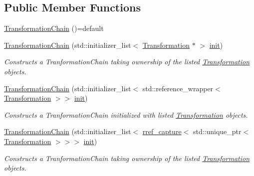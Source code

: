 \subsection*{Public Member Functions}
\begin{DoxyCompactItemize}
\item 
\hyperlink{structdg_1_1deepcore_1_1geometry_1_1_transformation_chain_a465ca21337bb9e529edb0d8b60cfbe38}{Transformation\+Chain} ()=default
\item 
\hyperlink{structdg_1_1deepcore_1_1geometry_1_1_transformation_chain_a0e088e1768bb70a847061b3fd445be9b}{Transformation\+Chain} (std\+::initializer\+\_\+list$<$ \hyperlink{structdg_1_1deepcore_1_1geometry_1_1_transformation}{Transformation} $\ast$ $>$ \hyperlink{namespacedg_1_1deepcore_1_1geometry_a232d4736f4033977fcd9d75e91c768b3}{init})
\begin{DoxyCompactList}\small\item\em Constructs a Tranformation\+Chain taking ownership of the listed \hyperlink{structdg_1_1deepcore_1_1geometry_1_1_transformation}{Transformation} objects. \end{DoxyCompactList}\item 
\hyperlink{structdg_1_1deepcore_1_1geometry_1_1_transformation_chain_a4e82357f5019839530419ef5dfb8ad62}{Transformation\+Chain} (std\+::initializer\+\_\+list$<$ std\+::reference\+\_\+wrapper$<$ \hyperlink{structdg_1_1deepcore_1_1geometry_1_1_transformation}{Transformation} $>$$>$ \hyperlink{namespacedg_1_1deepcore_1_1geometry_a232d4736f4033977fcd9d75e91c768b3}{init})
\begin{DoxyCompactList}\small\item\em Constructs a Tranformation\+Chain initialized with listed \hyperlink{structdg_1_1deepcore_1_1geometry_1_1_transformation}{Transformation} objects. \end{DoxyCompactList}\item 
\hyperlink{structdg_1_1deepcore_1_1geometry_1_1_transformation_chain_a13e8f48dc6aa57ba5701d444e04892ea}{Transformation\+Chain} (std\+::initializer\+\_\+list$<$ \hyperlink{classdg_1_1deepcore_1_1rref__capture}{rref\+\_\+capture}$<$ std\+::unique\+\_\+ptr$<$ \hyperlink{structdg_1_1deepcore_1_1geometry_1_1_transformation}{Transformation} $>$$>$$>$ \hyperlink{namespacedg_1_1deepcore_1_1geometry_a232d4736f4033977fcd9d75e91c768b3}{init})
\begin{DoxyCompactList}\small\item\em Constructs a Tranformation\+Chain taking ownership of the listed \hyperlink{structdg_1_1deepcore_1_1geometry_1_1_transformation}{Transformation} objects. \end{DoxyCompactList}\item 
$$
\end{DoxyCompactItemize}

